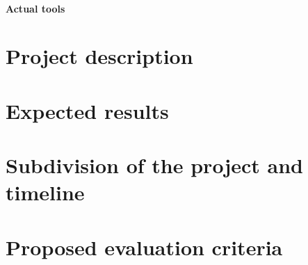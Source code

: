 \documentclass[12pt]{article}
\begin{document}
\paragraph{Actual tools}


\section{Project description}\label{sec:project-description}


\section{Expected results}\label{sec:expected-results}


\section{Subdivision of the project and timeline}\label{sec:subdivision-of-the-project-and-timeline}


\section{Proposed evaluation criteria}\label{sec:proposed-evaluation-criteria}




\end{document}
